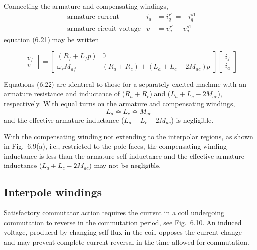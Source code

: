 \documentclass[a4paper,numbers=noenddot,12pt]{scrbook}
\begin{document}
        Connecting the armature and compensating windings,
        \begin{align*}
            &\text{armature current}  & i_a & = i_q^{r1} = -i_q^{s1} \\
            &\text{armature circuit voltage} & v & = v_q^{r1} - v_q^{s1}
            \label{}
        \end{align*}
        equation (6.21) may be written

        \begin{equation}
            \begin{bmatrix}
                v_f \\[2ex] v
            \end{bmatrix} =
            \begin{bmatrix}
                (R_f + L_f p) & 0 \\[2ex]
                \omega_r M_{af} & (R_a + R_c) + (L_a + L_c -2 M_{ac})p
            \end{bmatrix}
            \begin{bmatrix}
                i_f \\[2ex] i_a
            \end{bmatrix}
            \label{}
        \end{equation}

        Equations (6.22) are identical to those for a separately-excited machine with an armature resistance and inductance of ($R_a + R_c$) and ($L_a + L_c - 2M_{ac}$), respectively. With equal turns on the armature and compensating windings,
        \begin{equation*}
            L_a \bumpeq L_c \bumpeq M_{ac}
        \end{equation*}
        and the effective armature inductance ($L_a + L_c - 2M_{ac}$) is negligible.

        With the compensating winding not extending to the interpolar regions, as shown in Fig.\ 6.9(a), i.e., restricted to the pole faces, the compensating winding inductance is less than the armature self-inductance and the effective armature inductance ($L_a + L_c - 2M_{ac}$) may not be negligible.

        \subsection{Interpole windings}
        Satisfactory commutator action requires the current in a coil undergoing commutation to reverse in the commutation period, see Fig.\ 6.10. An induced voltage, produced by changing self-flux in the coil, opposes the current change and may prevent complete current reversal in the time allowed for commutation.
\end{document}
